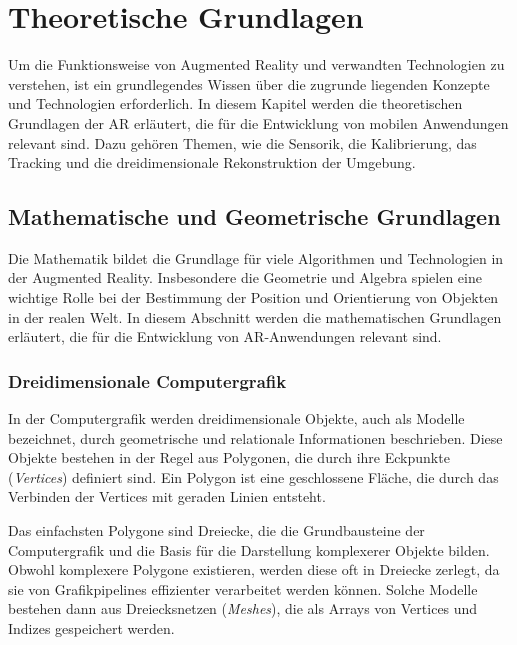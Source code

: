 \chapter{Theoretische Grundlagen}

Um die Funktionsweise von Augmented Reality und verwandten Technologien zu verstehen, ist ein grundlegendes Wissen über die zugrunde liegenden Konzepte und Technologien erforderlich. In diesem Kapitel werden die theoretischen Grundlagen der AR erläutert, die für die Entwicklung von mobilen Anwendungen relevant sind. Dazu gehören Themen, wie die Sensorik, die Kalibrierung, das Tracking und die dreidimensionale Rekonstruktion der Umgebung. \cite{doerner2022virtual}

\section{Mathematische und Geometrische Grundlagen}

Die Mathematik bildet die Grundlage für viele Algorithmen und Technologien in der Augmented Reality. Insbesondere die Geometrie und Algebra spielen eine wichtige Rolle bei der Bestimmung der Position und Orientierung von Objekten in der realen Welt. In diesem Abschnitt werden die mathematischen Grundlagen erläutert, die für die Entwicklung von AR-Anwendungen relevant sind.

\subsection{Dreidimensionale Computergrafik}

In der Computergrafik werden dreidimensionale Objekte, auch als Modelle bezeichnet, durch geometrische und relationale Informationen beschrieben. Diese Objekte bestehen in der Regel aus Polygonen, die durch ihre Eckpunkte (\emph{Vertices}) definiert sind. Ein Polygon ist eine geschlossene Fläche, die durch das Verbinden der Vertices mit geraden Linien entsteht. \cite{wikipedia2023polygons, espinoza2024graphics}

Das einfachsten Polygone sind Dreiecke, die die Grundbausteine der Computergrafik und die Basis für die Darstellung komplexerer Objekte bilden. Obwohl komplexere Polygone existieren, werden diese oft in Dreiecke zerlegt, da sie von Grafikpipelines effizienter verarbeitet werden können. Solche Modelle bestehen dann aus Dreiecksnetzen (\emph{Meshes}), die als Arrays von Vertices und Indizes gespeichert werden. \cite{wikipedia2023polygons, espinoza2024graphics}

